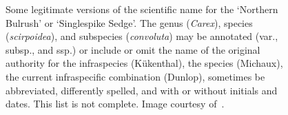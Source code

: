 \documentclass{bmcart}
\begin{document}

\newpage

\begin{figure}
  \begin{center}

  \caption{Some legitimate versions of the scientific name for the `Northern
    Bulrush' or `Singlespike Sedge'. The genus (\textit{Carex}), species
    (\textit{scirpoidea}), and subspecies (\textit{convoluta}) may be annotated
    (var., subsp., and ssp.) or include or omit the name of the original
    authority for the infraspecies (Kükenthal), the species (Michaux), the
    current infraspecific combination (Dunlop), sometimes be abbreviated,
    differently spelled, and with or without initials and dates. This list is
    not complete. Image courtesy of~\cite{FNA2002}.}\label{figure:carex}


\end{center}
\end{figure}
\end{document}
